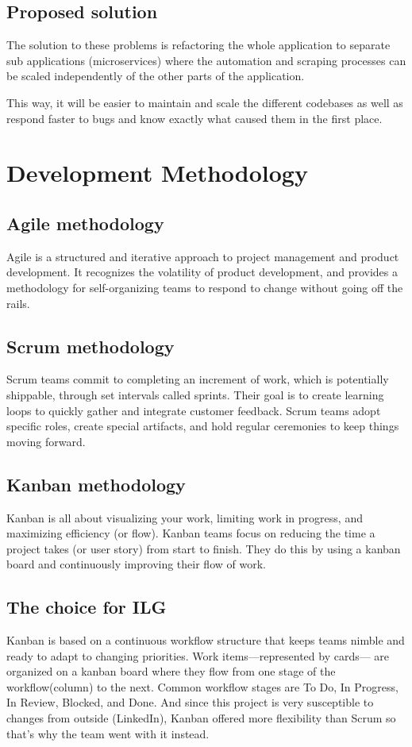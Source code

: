 \subsection{Proposed solution}
The solution to these problems is refactoring the whole application to separate sub applications (microservices) where the automation and scraping processes can be scaled independently of the other parts of the application.

\medskip
This way, it will be easier to maintain and scale the different codebases as well as respond faster to bugs and know exactly what caused them in the first place.

\newpage

\section{Development Methodology}
\subsection{Agile methodology}
Agile is a structured and iterative approach to project management and product development. It recognizes the volatility of product development, and provides a methodology for self-organizing teams to respond to change without going off the rails.
\subsection{Scrum methodology}
Scrum teams commit to completing an increment of work, which is potentially shippable, through set intervals called sprints. Their goal is to create learning loops to quickly gather and integrate customer feedback. Scrum teams adopt specific roles, create special artifacts, and hold regular ceremonies to keep things moving forward.
\subsection{Kanban methodology}
Kanban is all about visualizing your work, limiting work in progress, and maximizing efficiency (or flow). Kanban teams focus on reducing the time a project takes (or user story) from start to finish. They do this by using a kanban board and continuously improving their flow of work.
\subsection{The choice for ILG}
Kanban is based on a continuous workflow structure that keeps teams nimble and ready to adapt to changing priorities. Work items—represented by cards— are organized on a kanban board where they flow from one stage of the workflow(column) to the next. Common workflow stages are To Do, In Progress, In Review, Blocked, and Done. And since this project is very susceptible to changes from outside (LinkedIn), Kanban offered more flexibility than Scrum so that’s why the team went with it instead.

